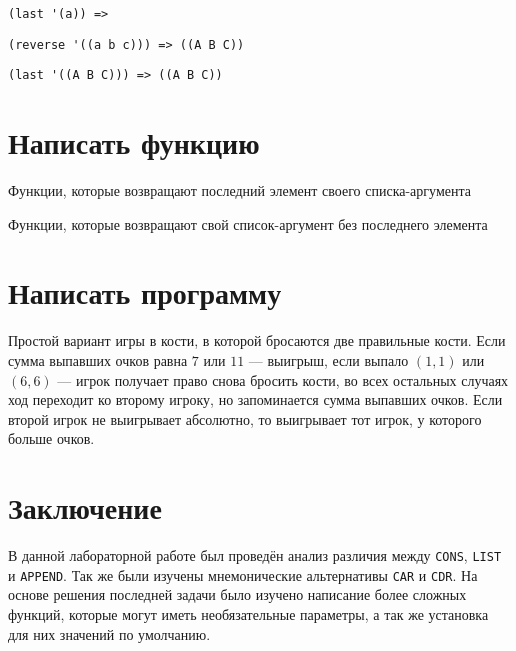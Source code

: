 \problem \hfill

\begin{lstlisting}
(last '(a)) => 
\end{lstlisting}


\problem \hfill

\begin{lstlisting}
(reverse '((a b c))) => ((A B C))
\end{lstlisting}


\problem \hfill

\begin{lstlisting}
(last '((A B C))) => ((A B C))
\end{lstlisting}



\section{Написать функцию}

\problem Функции, которые возвращают последний элемент своего списка-аргумента



\problem Функции, которые возвращают свой список-аргумент без последнего элемента




\section{Написать программу}

\problem Простой вариант игры в кости, в которой бросаются две правильные кости. Если сумма выпавших очков равна $7$ или $11$ --- выигрыш, если выпало $(1, 1)$ или $(6, 6)$ --- игрок получает право снова бросить кости, во всех остальных случаях ход переходит ко второму игроку, но запоминается сумма выпавших очков. Если второй игрок не выигрывает абсолютно, то выигрывает тот игрок, у которого больше очков.

\newpage
{}



\section{Заключение}

В данной лабораторной работе был проведён анализ различия между \verb|CONS|, \verb|LIST| и \verb|APPEND|. Так же были изучены мнемонические альтернативы \verb|CAR| и \verb|CDR|. На основе решения последней задачи было изучено написание более сложных функций, которые могут иметь необязательные параметры, а так же установка для них значений по умолчанию.
